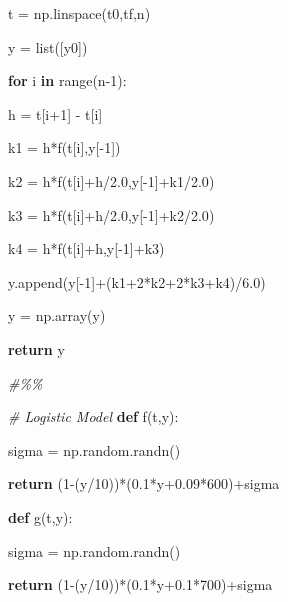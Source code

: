 \documentclass[
]{article}
\newenvironment{Shaded}{}{}
\newcommand{\BuiltInTok}[1]{#1}
\newcommand{\CommentTok}[1]{\textcolor[rgb]{0.38,0.63,0.69}{\textit{#1}}}
\newcommand{\ControlFlowTok}[1]{\textcolor[rgb]{0.00,0.44,0.13}{\textbf{#1}}}
\newcommand{\DecValTok}[1]{\textcolor[rgb]{0.25,0.63,0.44}{#1}}
\newcommand{\FloatTok}[1]{\textcolor[rgb]{0.25,0.63,0.44}{#1}}
\newcommand{\KeywordTok}[1]{\textcolor[rgb]{0.00,0.44,0.13}{\textbf{#1}}}
\newcommand{\NormalTok}[1]{#1}
\newcommand{\OperatorTok}[1]{\textcolor[rgb]{0.40,0.40,0.40}{#1}}
\begin{document}
\begin{Shaded}
\begin{Highlighting}[]
\NormalTok{    t }\OperatorTok{=}\NormalTok{ np.linspace(t0,tf,n)
}
\NormalTok{    y }\OperatorTok{=} \BuiltInTok{list}\NormalTok{([y0])
}
    \ControlFlowTok{for}\NormalTok{ i }\KeywordTok{in} \BuiltInTok{range}\NormalTok{(n}\OperatorTok{{-}}\DecValTok{1}\NormalTok{):
}
\NormalTok{        h }\OperatorTok{=}\NormalTok{ t[i}\OperatorTok{+}\DecValTok{1}\NormalTok{] }\OperatorTok{{-}}\NormalTok{ t[i]
}
\NormalTok{        k1 }\OperatorTok{=}\NormalTok{ h}\OperatorTok{*}\NormalTok{f(t[i],y[}\OperatorTok{{-}}\DecValTok{1}\NormalTok{])
}
\NormalTok{        k2 }\OperatorTok{=}\NormalTok{ h}\OperatorTok{*}\NormalTok{f(t[i]}\OperatorTok{+}\NormalTok{h}\OperatorTok{/}\FloatTok{2.0}\NormalTok{,y[}\OperatorTok{{-}}\DecValTok{1}\NormalTok{]}\OperatorTok{+}\NormalTok{k1}\OperatorTok{/}\FloatTok{2.0}\NormalTok{)
}
\NormalTok{        k3 }\OperatorTok{=}\NormalTok{ h}\OperatorTok{*}\NormalTok{f(t[i]}\OperatorTok{+}\NormalTok{h}\OperatorTok{/}\FloatTok{2.0}\NormalTok{,y[}\OperatorTok{{-}}\DecValTok{1}\NormalTok{]}\OperatorTok{+}\NormalTok{k2}\OperatorTok{/}\FloatTok{2.0}\NormalTok{)
}
\NormalTok{        k4 }\OperatorTok{=}\NormalTok{ h}\OperatorTok{*}\NormalTok{f(t[i]}\OperatorTok{+}\NormalTok{h,y[}\OperatorTok{{-}}\DecValTok{1}\NormalTok{]}\OperatorTok{+}\NormalTok{k3)
}
\NormalTok{        y.append(y[}\OperatorTok{{-}}\DecValTok{1}\NormalTok{]}\OperatorTok{+}\NormalTok{(k1}\OperatorTok{+}\DecValTok{2}\OperatorTok{*}\NormalTok{k2}\OperatorTok{+}\DecValTok{2}\OperatorTok{*}\NormalTok{k3}\OperatorTok{+}\NormalTok{k4)}\OperatorTok{/}\FloatTok{6.0}\NormalTok{)
}


\NormalTok{    y }\OperatorTok{=}\NormalTok{ np.array(y)
}


    \ControlFlowTok{return}\NormalTok{ y
}


\CommentTok{\#\%\%
}




\CommentTok{\# Logistic Model
}
\KeywordTok{def}\NormalTok{ f(t,y):
}
\NormalTok{    sigma }\OperatorTok{=}\NormalTok{ np.random.randn()
}
    \ControlFlowTok{return}\NormalTok{ (}\DecValTok{1}\OperatorTok{{-}}\NormalTok{(y}\OperatorTok{/}\DecValTok{10}\NormalTok{))}\OperatorTok{*}\NormalTok{(}\FloatTok{0.1}\OperatorTok{*}\NormalTok{y}\OperatorTok{+}\FloatTok{0.09}\OperatorTok{*}\DecValTok{600}\NormalTok{)}\OperatorTok{+}\NormalTok{sigma
}


\KeywordTok{def}\NormalTok{ g(t,y):
}
\NormalTok{    sigma }\OperatorTok{=}\NormalTok{ np.random.randn()
}
    \ControlFlowTok{return}\NormalTok{ (}\DecValTok{1}\OperatorTok{{-}}\NormalTok{(y}\OperatorTok{/}\DecValTok{10}\NormalTok{))}\OperatorTok{*}\NormalTok{(}\FloatTok{0.1}\OperatorTok{*}\NormalTok{y}\OperatorTok{+}\FloatTok{0.1}\OperatorTok{*}\DecValTok{700}\NormalTok{)}\OperatorTok{+}\NormalTok{sigma
}



\end{Highlighting}
\end{Shaded}
\end{document}
